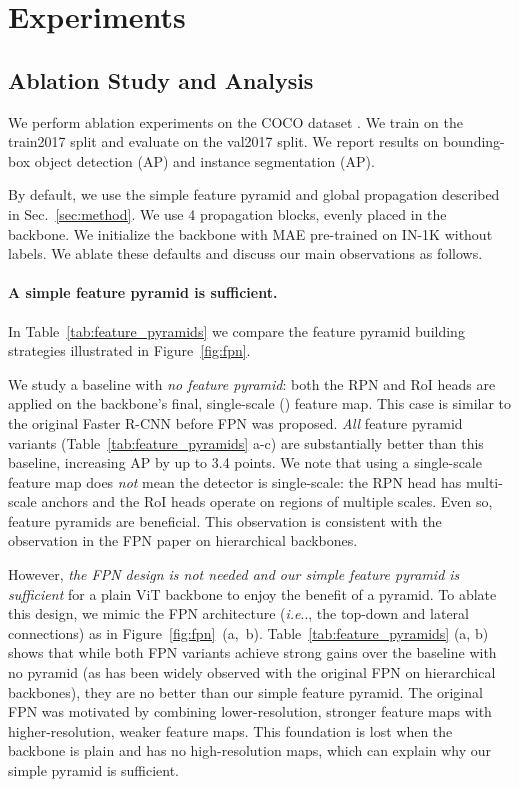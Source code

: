 \documentclass[runningheads]{llncs}
\makeatletter
\DeclareRobustCommand\onedot{\futurelet\@let@token\@onedot}
\def\@onedot{\ifx\@let@token.\else.\null\fi\xspace}
\def\ie{\emph{i.e}\onedot} \def\Ie{\emph{I.e}\onedot}
\makeatother
\begin{document}
\section{Experiments} \label{sec:exp}

\subsection{Ablation Study and Analysis} \label{subsec:ablation}

We perform ablation experiments on the COCO dataset \cite{Lin2014}. We train on the \textsf{train2017} split and evaluate on the \textsf{val2017} split. We report results on bounding-box object detection (AP) and instance segmentation (AP).

By default, we use the simple feature pyramid and global propagation described in Sec.~\ref{sec:method}. We use 4 propagation blocks, evenly placed in the backbone. We initialize the backbone with MAE \cite{He2021} pre-trained on IN-1K without labels. We ablate these defaults and discuss our main observations as follows.

\paragraph{A simple feature pyramid is sufficient.} In Table~\ref{tab:feature_pyramids} we compare the feature pyramid building strategies illustrated in Figure~\ref{fig:fpn}.

We study a baseline with \textit{no feature pyramid}: both the RPN and RoI heads are applied on the backbone's final, single-scale () feature map. This case is similar to the original Faster R-CNN \cite{Ren2015} before FPN was proposed. \textit{All} feature pyramid variants (Table~\ref{tab:feature_pyramids} a-c) are substantially better than this baseline, increasing AP by up to 3.4 points. We note that using a single-scale feature map does \textit{not} mean the detector is single-scale: the RPN head has multi-scale anchors and the RoI heads operate on regions of multiple scales. Even so, feature pyramids are beneficial. This observation is consistent with the observation in the FPN paper \cite{Lin2017} on hierarchical backbones.

However, \textit{the FPN design is not needed and our simple feature pyramid is sufficient} for a plain ViT backbone to enjoy the benefit of a pyramid. To ablate this design, we mimic the FPN architecture (\ie, the top-down and lateral connections) as in Figure~\mbox{\ref{fig:fpn} (a, b)}. 
Table~\ref{tab:feature_pyramids} (a, b) shows that
while both FPN variants achieve strong gains over the baseline with no pyramid (as has been widely observed with the original FPN on hierarchical backbones), they are no better than our simple feature pyramid.
The original FPN \cite{Lin2017} was motivated by combining lower-resolution, stronger feature maps with higher-resolution, weaker feature maps. This foundation is lost when the backbone is plain and has no high-resolution maps, which can explain why our simple pyramid is sufficient.
\end{document}
